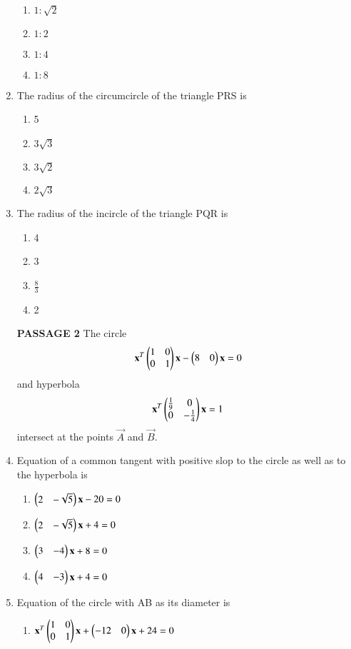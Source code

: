 \begin{enumerate}[label=\arabic*.,ref=\thesubsection.\theenumi]
    \begin{enumerate}
    \item $1:\sqrt{2}$
    \item $1:2$
    \item $1:4$
    \item $1:8$
    \end{enumerate}
    \item The radius of the circumcircle of the triangle PRS is
    \begin{enumerate}
    \item 5
    \item $3\sqrt{3}$
    \item $3\sqrt{2}$
    \item $2\sqrt{3}$
    \end{enumerate}
    \item The radius of the incircle of the triangle PQR is
    \begin{enumerate}
    \item 4
    \item 3
    \item $\frac{8}{3}$
    \item 2
    \end{enumerate}
    \textbf{PASSAGE 2}
    The circle
    \begin{align}
    \mathbf{x}^T\begin{pmatrix}1&0\\0&1\end{pmatrix}\mathbf{x}-\begin{pmatrix}8&0\end{pmatrix}\mathbf{x}=0
    \end{align} and hyperbola 
    \begin{align}
    \mathbf{x}^T\begin{pmatrix}\frac{1}{9}&0\\0&-\frac{1}{4}\end{pmatrix}\mathbf{x}=1 
    \end{align} intersect at the points $\vec{A}$ and $\vec{B}$.
    \item Equation of a common tangent with positive slop to the circle as well as to the hyperbola 		is
    \begin{enumerate}
    \item $\begin{pmatrix}2&-\sqrt{5}\end{pmatrix}\mathbf{x}-20=0$
    \item $\begin{pmatrix}2&-\sqrt{5}\end{pmatrix}\mathbf{x}+4=0$
    \item $\begin{pmatrix}3&-4\end{pmatrix}\mathbf{x}+8=0$
    \item $\begin{pmatrix}4&-3\end{pmatrix}\mathbf{x}+4=0$
    \end{enumerate}
    \item Equation of the circle with AB as its diameter is
    \begin{enumerate}
    \item $\mathbf{x}^T\begin{pmatrix}1&0\\0&1\end{pmatrix}\mathbf{x}+\begin{pmatrix}-12&0\end{pmatrix}\mathbf{x}+24=0$

\end{enumerate}
\end{enumerate}

